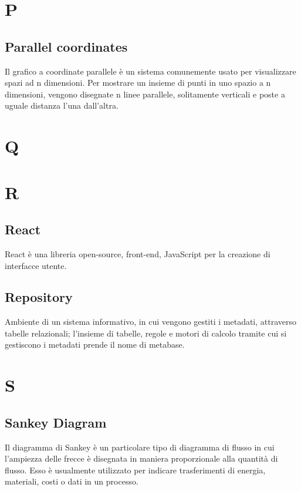 \newpage
\section{P}
\subsection{Parallel coordinates}
Il grafico a coordinate parallele è un sistema comunemente usato per visualizzare spazi ad n dimensioni. Per mostrare un insieme di punti in uno spazio a n dimensioni, vengono disegnate n linee parallele, solitamente verticali e poste a uguale distanza l'una dall'altra.

\newpage
\section{Q}

\newpage
\section{R}
\subsection{React}
React è una libreria open-source, front-end, JavaScript per la creazione di interfacce utente.

\subsection{Repository}
Ambiente di un sistema informativo, in cui vengono gestiti i metadati, attraverso tabelle relazionali;
l’insieme di tabelle, regole e motori di calcolo tramite cui si gestiscono i metadati prende il nome di
metabase.

\newpage
\section{S}
\subsection{Sankey Diagram}
Il diagramma di Sankey è un particolare tipo di diagramma di flusso in cui l'ampiezza delle frecce è disegnata in maniera proporzionale alla quantità di flusso.
Esso è usualmente utilizzato per indicare trasferimenti di energia, materiali, costi o dati in un processo.

